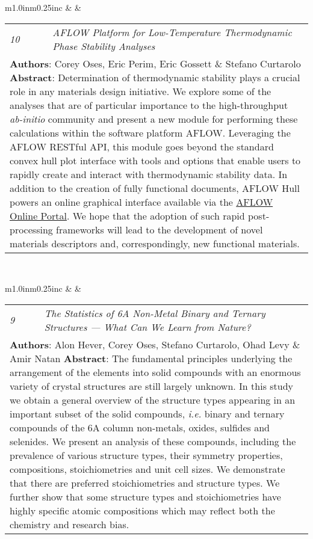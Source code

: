 \documentclass[11pt]{article}
\begin{document}
\begin{tabular}{m{1.0in}m{0.25in}c}
 & & 
\begin{tabular}{m{0.3in}m{0.15in}m{4.3in}}
\textit{\small{10}} & & \textit{{\small AFLOW} Platform for Low-Temperature Thermodynamic Phase Stability Analyses} \\ \multicolumn{3}{p{4.75in}}{\footnotesize{\textbf{Authors}: \textcolor{NavyBlue}{Corey Oses}, Eric Perim, Eric Gossett \& Stefano Curtarolo \newline \textbf{Abstract}: Determination of thermodynamic stability plays a crucial role in any materials design initiative. We explore some of the analyses that are of particular importance to the high-throughput \textit{ab-initio} community and present a new module for performing these calculations within the software platform {\small AFLOW}. Leveraging the {\small AFLOW} RESTful API, this module goes beyond the standard convex hull plot interface with tools and options that enable users to rapidly create and interact with thermodynamic stability data. In addition to the creation of fully functional documents, \small{AFLOW Hull} powers an online graphical interface available via the \href{http://aflow.org}{{\small AFLOW} Online Portal}. We hope that the adoption of such rapid post-processing frameworks will lead to the development of novel materials descriptors and, correspondingly, new functional materials.}} 
\end{tabular} \\ 
\end{tabular}

\vspace{0.25cm}

\begin{tabular}{m{1.0in}m{0.25in}c}
 & & 
\begin{tabular}{m{0.3in}m{0.15in}m{4.3in}}
\textit{\small{9}} & & \textit{The Statistics of 6A Non-Metal Binary and Ternary Structures --- What Can We Learn from Nature?} \\ \multicolumn{3}{p{4.75in}}{\footnotesize{\textbf{Authors}: Alon Hever, \textcolor{NavyBlue}{Corey Oses}, Stefano Curtarolo, Ohad Levy \& Amir Natan \newline \textbf{Abstract}: The fundamental principles underlying the arrangement of the elements into solid compounds with an enormous variety of crystal structures are still largely unknown. In this study we obtain a general overview of the structure types appearing in an important subset of the solid compounds, \textit{i.e.} binary and ternary compounds of the 6A column non-metals, oxides, sulfides and selenides. We present an analysis of these compounds, including the prevalence of various structure types, their symmetry properties, compositions, stoichiometries and unit cell sizes. We demonstrate that there are preferred stoichiometries and structure types. We further show that some structure types and stoichiometries have highly specific atomic compositions which may reflect both the chemistry and research bias.}} 
\end{tabular} \\ 
\end{tabular}
\end{document}
